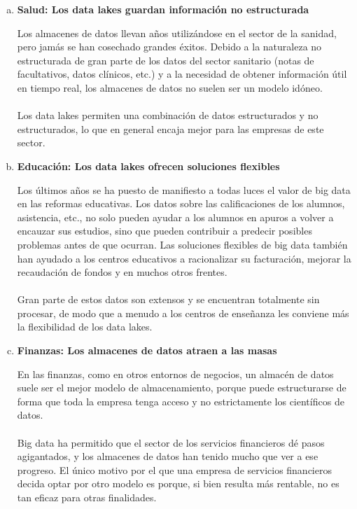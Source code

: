 \documentclass[11pt,a4paper]{article}
\begin{document}
		\begin{enumerate}[a.]
			\item \textbf{Salud: Los data lakes guardan información no estructurada}
			
			Los almacenes de datos llevan años utilizándose en el sector de la sanidad, pero jamás se han cosechado grandes éxitos. Debido a la naturaleza no estructurada de gran parte de los datos del sector sanitario (notas de facultativos, datos clínicos, etc.) y a la necesidad de obtener información útil en tiempo real, los almacenes de datos no suelen ser un modelo idóneo.\\
			\\
			Los data lakes permiten una combinación de datos estructurados y no estructurados, lo que en general encaja mejor para las empresas de este sector.
			\newpage
			
			\item \textbf{Educación: Los data lakes ofrecen soluciones flexibles}
			
			Los últimos años se ha puesto de manifiesto a todas luces el valor de big data en las reformas educativas. Los datos sobre las calificaciones de los alumnos, asistencia, etc., no solo pueden ayudar a los alumnos en apuros a volver a encauzar sus estudios, sino que pueden contribuir a predecir posibles problemas antes de que ocurran. Las soluciones flexibles de big data también han ayudado a los centros educativos a racionalizar su facturación, mejorar la recaudación de fondos y en muchos otros frentes.\\
			\\
			Gran parte de estos datos son extensos y se encuentran totalmente sin procesar, de modo que a menudo a los centros de enseñanza les conviene más la flexibilidad de los data lakes.
			
			\item \textbf{Finanzas: Los almacenes de datos atraen a las masas}
			
			En las finanzas, como en otros entornos de negocios, un almacén de datos suele ser el mejor modelo de almacenamiento, porque puede estructurarse de forma que toda la empresa tenga acceso y no estrictamente los científicos de datos.\\
			\\
			Big data ha permitido que el sector de los servicios financieros dé pasos agigantados, y los almacenes de datos han tenido mucho que ver a ese progreso. El único motivo por el que una empresa de servicios financieros decida optar por otro modelo es porque, si bien resulta más rentable, no es tan eficaz para otras finalidades.
			

\end{enumerate}
\end{document}
